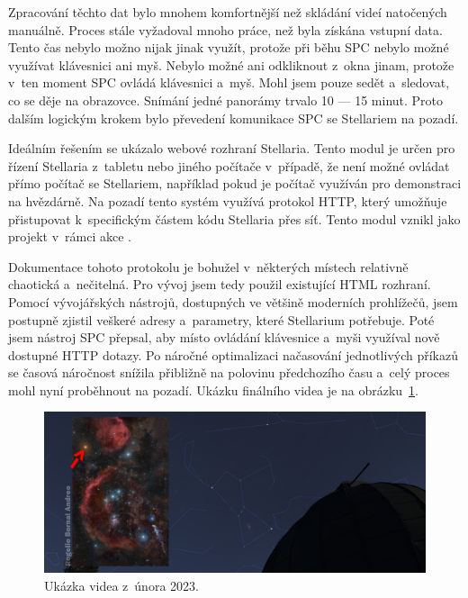 \documentclass[12pt,a4paper,titlepage]{article}
\begin{document}
Zpracování těchto dat bylo mnohem komfortnější než skládání videí natočených manuálně. Proces stále vyžadoval mnoho práce, než byla získána vstupní data. Tento čas nebylo možno nijak jinak využít, protože při běhu SPC nebylo možné využívat klávesnici ani myš. Nebylo možné ani odkliknout z~okna jinam, protože v~ten moment SPC ovládá klávesnici a~myš. Mohl jsem pouze sedět a~sledovat, co se děje na obrazovce. Snímání jedné panorámy trvalo 10 --- 15 minut. Proto dalším logickým krokem bylo převedení komunikace SPC se Stellariem na pozadí. 

Ideálním řešením se ukázalo webové rozhraní Stellaria. Tento modul je určen pro řízení Stellaria z~tabletu nebo jiného počítače v~případě, že není možné ovládat přímo počítač se Stellariem, například pokud je počítač využíván pro demonstraci na hvězdárně. Na pozadí tento systém využívá protokol HTTP, který umožňuje přistupovat k~specifickým částem kódu Stellaria přes síť. Tento modul vznikl jako projekt v~rámci akce . 

Dokumentace tohoto protokolu je bohužel v~některých místech relativně chaotická a~nečitelná. Pro vývoj jsem tedy použil existující HTML rozhraní. Pomocí vývojářských nástrojů, dostupných ve většině moderních prohlížečů, jsem postupně zjistil veškeré adresy a~parametry, které Stellarium potřebuje. Poté jsem nástroj SPC přepsal, aby místo ovládání klávesnice a~myši využíval nově dostupné HTTP dotazy. Po náročné optimalizaci načasování jednotlivých příkazů se časová náročnost snížila přibližně na polovinu předchozího času a~celý proces mohl nyní proběhnout na pozadí. Ukázku finálního videa je na obrázku~\ref{img:unor}.

\begin{figure}[H]
	\centering
	\includegraphics[width=.85\textwidth]{unor.png}
	\caption{Ukázka videa z~února 2023.}\label{img:unor}
\end{figure}
\end{document}
